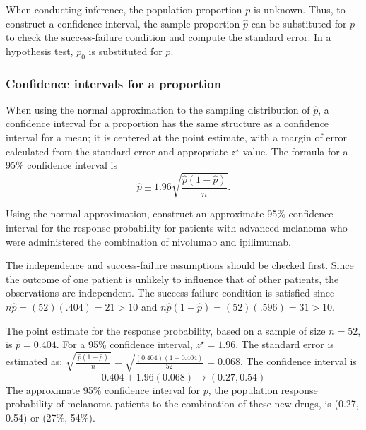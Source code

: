 When conducting inference, the population proportion $p$ is unknown. Thus, to construct a confidence interval, the sample proportion $\hat{p}$ can be substituted for $p$ to check the success-failure condition and compute the standard error. In a hypothesis test, $p_0$ is substituted for $p$.

\subsubsection{Confidence intervals for a proportion}
\label{confIntForPropSection}


When using the normal approximation to the sampling distribution of $\hat{p}$, a confidence interval for a proportion has the same structure as a confidence interval for a mean; it is centered at the point estimate, with a margin of error calculated from the standard error and appropriate $z^{\star}$ value.  The formula for a 95\% confidence interval is
\[
  \hat{p} \pm 1.96 \sqrt{\frac{\hat{p}(1-\hat{p})}{n}}.
\]

\begin{examplewrap}
\begin{nexample}{Using the normal approximation, construct an approximate 95\% confidence interval for the response probability for patients with advanced melanoma who were administered the combination of nivolumab and ipilimumab.}

The independence and success-failure assumptions should be checked first.  Since the outcome of one patient is unlikely to influence that of other patients, the observations are independent.  The success-failure condition is satisfied since $n\hat{p} = (52)(.404) = 21  > 10$ and $n\hat{p}(1 - \hat{p}) = (52)(.596) = 31  > 10$.

The point estimate for the response probability, based on a sample of size $n = 52$, is $\hat{p} = 0.404$. For a 95\% confidence interval, $z^{\star} = 1.96$. The standard error is estimated as: $\sqrt{\frac{\ \hat{p}(1-\hat{p})\ }{n}} = \sqrt{\frac{(0.404)(1-0.404)}{52}} = 0.068$.  The confidence interval is
\[0.404 \pm 1.96 (0.068) \rightarrow (0.27, 0.54) \]
The approximate 95\% confidence interval for $p$, the population response probability of melanoma patients to the combination of these new drugs, is (0.27, 0.54) or (27\%, 54\%).
\end{nexample}
\end{examplewrap}


